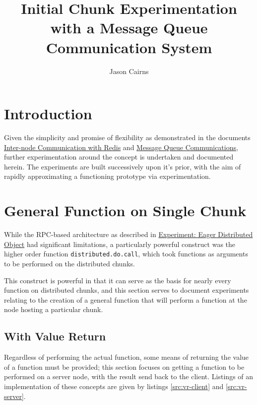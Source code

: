 \documentclass[a4paper,10pt]{article}
\begin{document}
\title{Initial Chunk Experimentation with a Message Queue Communication System}
\author{Jason Cairns}
  
\maketitle{}

\section{Introduction}

Given the simplicity and promise of flexibility as demonstrated in the
documents \href{inter-node-comm-w-redis.pdf}{Inter-node Communication with
Redis} and \href{message-queues-comms.pdf}{Message Queue Communications},
further experimentation around the concept is undertaken and documented herein.
The experiments are built successively upon it's prior, with the aim of rapidly
approximating a functioning prototype via experimentation.

\section{General Function on Single Chunk}

While the RPC-based architecture as described in
\href{experiment-eager-dist-obj-pre.pdf}{Experiment: Eager Distributed Object}
had significant limitations, a particularly powerful construct was the higher
order function \texttt{distributed.do.call}, which took functions as arguments
to be performed on the distributed chunks.

This construct is powerful in that it can serve as the basis for nearly every
function on distributed chunks, and this section serves to document experiments
relating to the creation of a general function that will perform a function at
the node hosting a particular chunk.

\subsection{With Value Return}\label{sec:val-ret}

Regardless of performing the actual function, some means of returning the value
of a function must be provided; this section focuses on getting a function to
be performed on a server node, with the result send back to the client.
Listings of an implementation of these concepts are given by listings
\ref{src:vr-client} and \ref{src:vr-server}.
\end{document}
